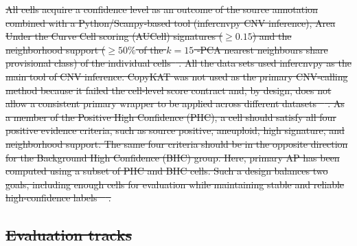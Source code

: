 \documentclass[10pt]{article}
\providecommand{\DIFdeltex}[1]{{\protect\color{red}\sout{#1}}}                      %
\providecommand{\DIFdel}[1]{\texorpdfstring{\DIFdeltex{#1}}{}} %
\begin{document}
\DIFdel{All cells acquire a confidence level as an outcome of the source annotation combined with a Python/Scanpy-based tool (infercnvpy CNV inference), Area Under the Curve Cell scoring (AUCell) signatures ($\geq 0.15$) and the neighborhood support ($\geq50\%$ of the $k=15$ -PCA nearest neighbours share provisional class) of the individual cells\mbox{%
\cite{chen2025benchmarking,gao2021delineating,hetzel2021graph,fa2026cell}}\hskip0pt%
. All the data sets used infercnvpy as the main tool of CNV inference. CopyKAT was not used as the primary CNV-calling method because it failed the cell-level score contract and, by design, does not allow a consistent primary wrapper to be applied across different datasets \mbox{%
\cite{chen2025benchmarking}}\hskip0pt%
. As a member of the Positive High Confidence (PHC), a cell should satisfy all four positive evidence criteria, such as source positive, aneuploid, high signature, and neighborhood support. The same four criteria should be in the opposite direction for the Background High Confidence (BHC) group. Here, primary AP has been computed using a subset of PHC and BHC cells. Such a design balances two goals, including enough cells for evaluation while maintaining stable and reliable high-confidence labels \mbox{%
\cite{stegle2015computational,abdelaal2019comparison}}\hskip0pt%
.
}%

\subsection{\DIFdel{Evaluation tracks}}
\addtocounter{subsection}{-1}%
\end{document}
